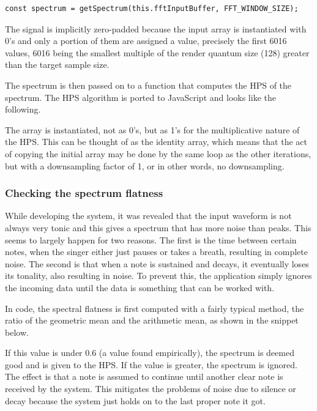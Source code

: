 \begin{lstlisting}[style=javascript]
    const spectrum = getSpectrum(this.fftInputBuffer, FFT_WINDOW_SIZE);
\end{lstlisting}

The signal is implicitly zero-padded because the input array is instantiated with 0's and only a portion of them are assigned a value, precisely the first 6016 values, 6016 being the smallest multiple of the render quantum size (128) greater than the target sample size.

The spectrum is then passed on to a function that computes the HPS of the spectrum. The HPS algorithm is ported to JavaScript and looks like the following. 



The array is instantiated, not as 0's, but as 1's for the multiplicative nature of the HPS. This can be thought of as the identity array, which means that the act of copying the initial array may be done by the same loop as the other iterations, but with a downsampling factor of 1, or in other words, no downsampling.

\subsubsection{Checking the spectrum flatness}
While developing the system, it was revealed that the input waveform is not always very tonic and this gives a spectrum that has more noise than peaks. This seems to largely happen for two reasons. The first is the time between certain notes, when the singer either just pauses or takes a breath, resulting in complete noise. The second is that when a note is sustained and decays, it eventually loses its tonality, also resulting in noise. To prevent this, the application simply ignores the incoming data until the data is something that can be worked with. 

In code, the spectral flatness is first computed with a fairly typical method, the ratio of the geometric mean and the arithmetic mean, as shown in the snippet below.



If this value is under $0.6$ (a value found empirically), the spectrum is deemed good and is given to the HPS. If the value is greater, the spectrum is ignored. The effect is that a note is assumed to continue until another clear note is received by the system. This mitigates the problems of noise due to silence or decay because the system just holds on to the last proper note it got. 

